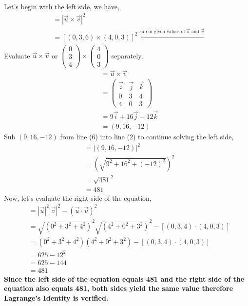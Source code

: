 \documentclass[12pt]{book}
\begin{document}
\begin{enumerate}
Let's begin with the left side, we have,
\begin{align}
    &= |\vec{u} \times \vec{v}|^2 \\
    &= \left[(0,3,6) \times (4,0,3)\right]^2 \xleftarrow[]{\text{sub in given values of } \vec{u} \text{ and } \vec{v}}
\end{align}
Evaluate $\vec{u} \times \vec{v}$ or $\left(\begin{smallmatrix} 0 \\ 3 \\ 4\end{smallmatrix}\right) \times \left(\begin{smallmatrix} 4 \\ 0 \\ 3 \end{smallmatrix}\right)$ separately,
\begingroup
\addtolength{\jot}{0.5em}
\begin{align}
    &= \vec{u} \times \vec{v} \\
    &= \begin{pmatrix}
          \vec{i} & \vec{j} & \vec{k} \\ 
          0 & 3 & 4 \\
          4 & 0 & 3
       \end{pmatrix}\\
    &= 9\vec{i} + 16\vec{j} - 12\vec{k} \\
    &= (9,16,-12)
\end{align}
\endgroup
Sub $(9,16,-12)$ from line (6) into line (2) to continue solving the left side,
\begin{align}
    &= |(9,16,-12)|^2 \\
    &= \left( \sqrt{9^2+16^2+(-12)^2} \right)^2 \\
    &= \sqrt{481}^2 \\
    &= 481
\end{align}
Now, let's evaluate the right side of the equation,
\begin{align}
    &= |\vec{u}|^2|\vec{v}|^2 - (\vec{u} \cdot \vec{v})^2 \\
    &= \sqrt{(0^2+3^2+4^2)}^2 \sqrt{(4^2+0^2+3^2)}^2 - \left[(0,3,4)\cdot(4,0,3)\right] \\
    &= (0^2+3^2+4^2)(4^2+0^2+3^2) - \left[(0,3,4)\cdot(4,0,3)\right]\\
    &= 625 - 12^2 \\
    &= 625 - 144 \\
    &= 481
\end{align}
\textbf{Since the left side of the equation equals 481 and the right side of the equation also equals 481, both sides yield the same value therefore Lagrange's Identity is verified.}


\end{enumerate}
\end{document}
